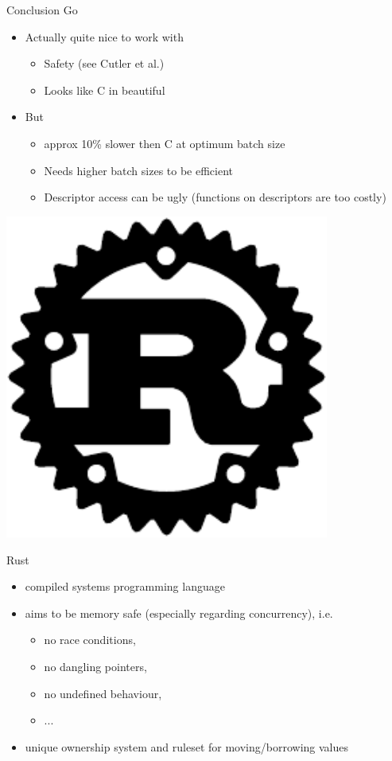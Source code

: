 \documentclass[NET,english,aspectratio=169,notitleframe,draft]{tumbeamer}
\begin{document}
\begin{frame}{Conclusion Go}
\begin{itemize}
\item Actually quite nice to work with
\begin{itemize}
\item Safety (see Cutler et al.)
\item Looks like C in beautiful
\end{itemize}
\item<2-> But
\begin{itemize}
\item<2-> approx 10\% slower then C at optimum batch size
\item<2-> Needs higher batch sizes to be efficient
\item<2-> Descriptor access can be ugly (functions on descriptors are too costly)
\end{itemize}
\end{itemize}
\end{frame}

\begin{frame}{}
\centering\includegraphics[width=0.8\textwidth]{pics/rust}
\end{frame}

\begin{frame}{Rust}
\begin{itemize}
\item compiled systems programming language
\item aims to be memory safe (especially regarding concurrency), i.e.
\begin{itemize}
\item no race conditions,
\item no dangling pointers,
\item no undefined behaviour,
\item ...
\end{itemize}
\item unique ownership system and ruleset for moving/borrowing values
\end{itemize}
\end{frame}
\end{document}
